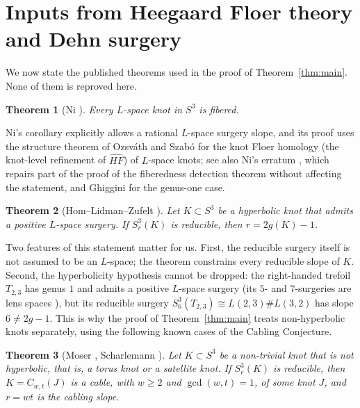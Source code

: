 \documentclass[11pt]{article}
\newcommand{\Surg}[2]{S^3_{#1}(#2)}
\newcommand{\HFhat}{\widehat{HF}}
\newtheorem{theorem}{Theorem}[section]
\theoremstyle{definition}
\theoremstyle{remark}
\begin{document}
\section{Inputs from Heegaard Floer theory and Dehn surgery}\label{sec:inputs}

We now state the published theorems used in the proof of
Theorem~\ref{thm:main}. None of them is reproved here.

\begin{theorem}[Ni {\cite[Corollary~1.3]{Ni2007}}]\label{thm:ni}
Every \(L\)-space knot in \(S^3\) is fibered.
\end{theorem}

Ni's corollary explicitly allows a rational \(L\)-space surgery slope,
and its proof uses the structure theorem of Ozsv\'ath and Szab\'o
\cite{OS2005} for the knot Floer homology (the knot-level refinement of
\(\HFhat\)) of \(L\)-space knots; see also
Ni's erratum \cite{NiCorrigendum}, which repairs part of the proof of
the fiberedness detection theorem without affecting the statement, and
Ghiggini \cite{Ghiggini2008} for the genus-one case.

\begin{theorem}[Hom--Lidman--Zufelt {\cite[Theorem~1.3]{HLZ2015}}]\label{thm:hlz}
Let \(K\subset S^3\) be a hyperbolic knot that admits a positive
\(L\)-space surgery. If \(\Surg{r}{K}\) is reducible, then
\(r=2g(K)-1\).
\end{theorem}

Two features of this statement matter for us. First, the reducible
surgery itself is not assumed to be an \(L\)-space; the theorem
constrains every reducible slope of \(K\). Second, the hyperbolicity
hypothesis cannot be dropped: the right-handed trefoil \(T_{2,3}\) has
genus \(1\) and admits a positive \(L\)-space surgery (its \(5\)- and
\(7\)-surgeries are lens spaces \cite{Moser1971}), but its reducible
surgery \(\Surg{6}{T_{2,3}}\cong L(2,3)\#L(3,2)\) has slope
\(6\neq 2g-1\).
This is why the proof of Theorem~\ref{thm:main} treats non-hyperbolic
knots separately, using the following known cases of the Cabling
Conjecture.

\begin{theorem}[Moser {\cite{Moser1971}}, Scharlemann {\cite[Corollaries~4.4--4.5]{Scharlemann1990}}]\label{thm:cabling}
Let \(K\subset S^3\) be a non-trivial knot that is not hyperbolic, that
is, a torus knot or a satellite knot. If \(\Surg{r}{K}\) is reducible,
then \(K=C_{w,t}(J)\) is a cable, with \(w\geq2\) and \(\gcd(w,t)=1\), of
some knot \(J\), and \(r=wt\) is the cabling slope.
\end{theorem}
\end{document}
